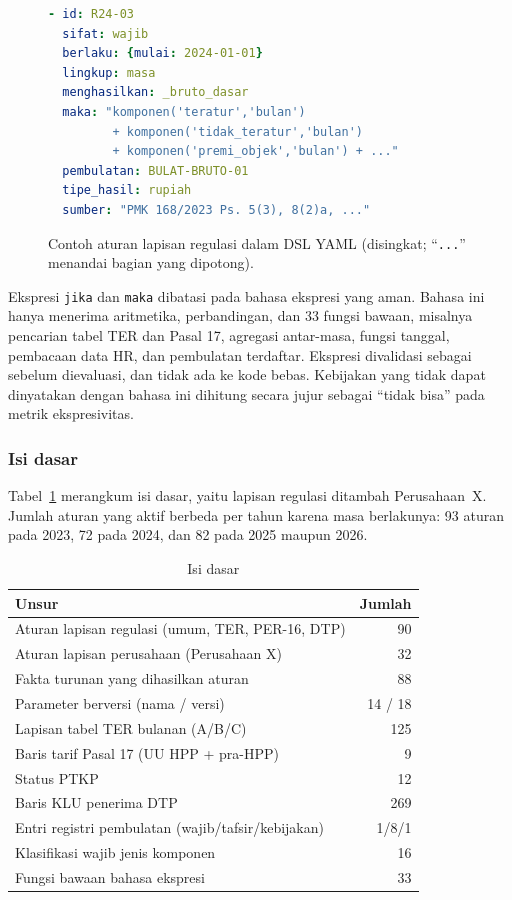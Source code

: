 \begin{figure}[t]
\begin{lstlisting}[language=yaml]
- id: R24-03
  sifat: wajib
  berlaku: {mulai: 2024-01-01}
  lingkup: masa
  menghasilkan: _bruto_dasar
  maka: "komponen('teratur','bulan')
         + komponen('tidak_teratur','bulan')
         + komponen('premi_objek','bulan') + ..."
  pembulatan: BULAT-BRUTO-01
  tipe_hasil: rupiah
  sumber: "PMK 168/2023 Ps. 5(3), 8(2)a, ..."
\end{lstlisting}
\caption{Contoh aturan lapisan regulasi dalam DSL YAML (disingkat; ``\texttt{...}'' menandai bagian yang dipotong).}
\label{lst:aturan}
\end{figure}

Ekspresi \texttt{jika} dan \texttt{maka} dibatasi pada bahasa ekspresi yang aman. Bahasa ini hanya menerima aritmetika, perbandingan, dan 33 fungsi bawaan, misalnya pencarian tabel TER dan Pasal 17, agregasi antar-masa, fungsi tanggal, pembacaan data HR, dan pembulatan terdaftar. Ekspresi divalidasi sebagai  sebelum dievaluasi, dan tidak ada  ke kode bebas. Kebijakan yang tidak dapat dinyatakan dengan bahasa ini dihitung secara jujur sebagai ``tidak bisa'' pada metrik ekspresivitas.

\subsubsection{Isi  dasar}
Tabel~\ref{tab:kb} merangkum isi  dasar, yaitu lapisan regulasi ditambah Perusahaan~X. Jumlah aturan yang aktif berbeda per tahun karena masa berlakunya: 93 aturan pada 2023, 72 pada 2024, dan 82 pada 2025 maupun 2026.

\begin{table}[t]
\centering
\caption{Isi  dasar}
\label{tab:kb}
\footnotesize
\begin{tabular}{@{}lr@{}}
\toprule
\textbf{Unsur} & \textbf{Jumlah} \\
\midrule
Aturan lapisan regulasi (umum, TER, PER-16, DTP) & 90 \\
Aturan lapisan perusahaan (Perusahaan X) & 32 \\
Fakta turunan yang dihasilkan aturan & 88 \\
Parameter berversi (nama / versi) & 14 / 18 \\
Lapisan tabel TER bulanan (A/B/C) & 125 \\
Baris tarif Pasal 17 (UU HPP + pra-HPP) & 9 \\
Status PTKP & 12 \\
Baris KLU penerima DTP & 269 \\
Entri registri pembulatan (wajib/tafsir/kebijakan) & 1/8/1 \\
Klasifikasi wajib jenis komponen & 16 \\
Fungsi bawaan bahasa ekspresi & 33 \\
\bottomrule
\end{tabular}
\end{table}

